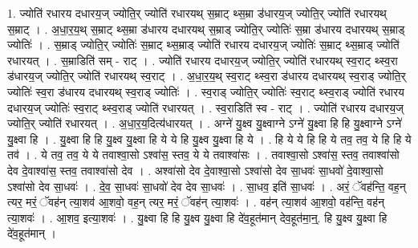 \documentclass[17pt]{extarticle}
\begin{document}
1. ज्योति॑ रधारय दधारय॒ज् ज्योति॒र् ज्योति॑ रधारयथ् स॒म्राट् थ्स॒म्रा ड॑धारय॒ज् ज्योति॒र् ज्योति॑ रधारयथ् स॒म्राट् । . अ॒धा॒र॒य॒थ् स॒म्राट् थ्स॒म्रा ड॑धारय दधारयथ् स॒म्राड् ज्योति॒र् ज्योतिः॑ स॒म्रा ड॑धारय दधारयथ् स॒म्राड् ज्योतिः॑ । . स॒म्राड् ज्योति॒र् ज्योतिः॑ स॒म्राट् थ्स॒म्राड् ज्योति॑ रधारय दधारय॒ज् ज्योतिः॑ स॒म्राट् थ्स॒म्राड् ज्योति॑ रधारयत् । . स॒म्राडिति॑ सम् - राट् । . ज्योति॑ रधारय दधारय॒ज् ज्योति॒र् ज्योति॑ रधारयथ् स्व॒राट् थ्स्व॒रा ड॑धारय॒ज् ज्योति॒र् ज्योति॑ रधारयथ् स्व॒राट् । . अ॒धा॒र॒य॒थ् स्व॒राट् थ्स्व॒रा ड॑धारय दधारयथ् स्व॒राड् ज्योति॒र् ज्योतिः॑ स्व॒रा ड॑धारय दधारयथ् स्व॒राड् ज्योतिः॑ । . स्व॒राड् ज्योति॒र् ज्योतिः॑ स्व॒राट् थ्स्व॒राड् ज्योति॑ रधारय दधारय॒ज् ज्योतिः॑ स्व॒राट् थ्स्व॒राड् ज्योति॑ रधारयत् । . स्व॒राडिति॑ स्व - राट् । . ज्योति॑ रधारय दधारय॒ज् ज्योति॒र् ज्योति॑ रधारयत् । . अ॒धा॒र॒य॒दित्य॑धारयत् । . अग्ने॑ यु॒क्ष्व यु॒क्ष्वाग्ने ऽग्ने॑ यु॒क्ष्वा हि हि यु॒क्ष्वाग्ने ऽग्ने॑ यु॒क्ष्वा हि । . यु॒क्ष्वा हि हि यु॒क्ष्व यु॒क्ष्वा हि ये ये हि यु॒क्ष्व यु॒क्ष्वा हि ये । . हि ये ये हि हि ये तव॒ तव॒ ये हि हि ये तव॑ । . ये तव॒ तव॒ ये ये तवाश्वा॒सो ऽश्वा॑स॒ स्तव॒ ये ये तवाश्वा॑सः । . तवाश्वा॒सो ऽश्वा॑स॒ स्तव॒ तवाश्वा॑सो देव दे॒वाश्वा॑स॒ स्तव॒ तवाश्वा॑सो देव । . अश्वा॑सो देव दे॒वाश्वा॒सो ऽश्वा॑सो देव सा॒धवः॑ सा॒धवो॑ दे॒वाश्वा॒सो ऽश्वा॑सो देव सा॒धवः॑ । . दे॒व॒ सा॒धवः॑ सा॒धवो॑ देव देव सा॒धवः॑ । . सा॒धव॒ इति॑ सा॒धवः॑ । . अरं॒ ॅवह॑न्ति॒ वह॒न् त्यर॒ मरं॒ ॅवह॑न् त्या॒शव॑ आ॒शवो॒ वह॒न् त्यर॒ मरं॒ ॅवह॑न् त्या॒शवः॑ । . वह॑न् त्या॒शव॑ आ॒शवो॒ वह॑न्ति॒ वह॑न् त्या॒शवः॑ । . आ॒शव॒ इत्या॒शवः॑ । . यु॒क्ष्वा हि हि यु॒क्ष्व यु॒क्ष्वा हि दे॑व॒हूत॑मान् देव॒हूत॑मा॒न्॒. हि यु॒क्ष्व यु॒क्ष्वा हि दे॑व॒हूत॑मान् । \newline
\end{document}
